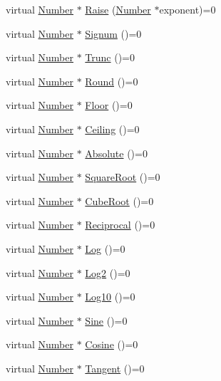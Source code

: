\begin{DoxyCompactItemize}
virtual \hyperlink{structNumber}{Number} $\ast$ \hyperlink{structNumber_ad258f0357483820672fe2bc41a569dd3}{Raise} (\hyperlink{structNumber}{Number} $\ast$exponent)=0
\item 
virtual \hyperlink{structNumber}{Number} $\ast$ \hyperlink{structNumber_ab855ebca1f99be092914ae41aff52204}{Signum} ()=0
\item 
virtual \hyperlink{structNumber}{Number} $\ast$ \hyperlink{structNumber_a18dc6a153c55c3b0295b5d5fe1f6ab7d}{Trunc} ()=0
\item 
virtual \hyperlink{structNumber}{Number} $\ast$ \hyperlink{structNumber_abc34ae359f4b660cccd21d36e7e46334}{Round} ()=0
\item 
virtual \hyperlink{structNumber}{Number} $\ast$ \hyperlink{structNumber_ae0f6a7e7552384f7a2781aaf0c6c2837}{Floor} ()=0
\item 
virtual \hyperlink{structNumber}{Number} $\ast$ \hyperlink{structNumber_af6cc655e7d0eeb4f68a091456dddc25a}{Ceiling} ()=0
\item 
virtual \hyperlink{structNumber}{Number} $\ast$ \hyperlink{structNumber_acdbe13cd9862bb73225a893fb14de2a5}{Absolute} ()=0
\item 
virtual \hyperlink{structNumber}{Number} $\ast$ \hyperlink{structNumber_a388fb639e9a8232cb4083e581352311c}{Square\+Root} ()=0
\item 
virtual \hyperlink{structNumber}{Number} $\ast$ \hyperlink{structNumber_a2c1fed99c53bc717da667e037fbf871b}{Cube\+Root} ()=0
\item 
virtual \hyperlink{structNumber}{Number} $\ast$ \hyperlink{structNumber_a3048907149c34115a40461c848a34e9e}{Reciprocal} ()=0
\item 
virtual \hyperlink{structNumber}{Number} $\ast$ \hyperlink{structNumber_a50a23b917c744ce16f0a4eb4e6f76071}{Log} ()=0
\item 
virtual \hyperlink{structNumber}{Number} $\ast$ \hyperlink{structNumber_a8ace103bb7d32fabc11b65d00ab70f6a}{Log2} ()=0
\item 
virtual \hyperlink{structNumber}{Number} $\ast$ \hyperlink{structNumber_a53f6451df2a81d0ab48887e41f9c98f9}{Log10} ()=0
\item 
virtual \hyperlink{structNumber}{Number} $\ast$ \hyperlink{structNumber_a493b5d26f9791985315624a0e9cb9dd6}{Sine} ()=0
\item 
virtual \hyperlink{structNumber}{Number} $\ast$ \hyperlink{structNumber_a39425d97b36e17af4a26f8494a4b6ac4}{Cosine} ()=0
\item 
virtual \hyperlink{structNumber}{Number} $\ast$ \hyperlink{structNumber_a4a49daab06d7311db480e2cf81e1da67}{Tangent} ()=0

\end{DoxyCompactItemize}
